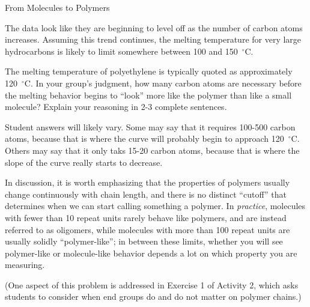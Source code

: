 \begin{activity}{From Molecules to Polymers}
\begin{ctqs}
		\begin{solution}[2in]
		
			The data look like they are beginning to level off as the number of carbon atoms increases.  Assuming this trend continues, the melting temperature for very large hydrocarbons is likely to limit somewhere between 100 and 150~${}^\circ$C. 
		\end{solution}
	
	\question The melting temperature of polyethylene is typically quoted as approximately 120~${}^\circ$C.  In your group's judgment, how many carbon atoms are necessary before the melting behavior begins to ``look'' more like the polymer than like a small molecule?  Explain your reasoning in 2-3 complete sentences. \label{\labelbase:ctq:npolymer}
	
		\begin{solution}[2in]
		
			Student answers will likely vary.  Some may say that it requires 100-500 carbon atoms, because that is where the curve will probably begin to approach 120~${}^\circ$C.  Others may say that it only taks 15-20 carbon atoms, because that is where the slope of the curve really starts to decrease.
			
			In discussion, it is worth emphasizing that the properties of polymers usually change continuously with chain length, and there is no distinct ``cutoff'' that determines when we can start calling something a polymer.  In \emph{practice}, molecules with fewer than 10 repeat units rarely behave like polymers, and are instead referred to as oligomers, while molecules with more than 100 repeat units are usually solidly ``polymer-like''; in between these limits, whether you will see polymer-like or molecule-like behavior depends a lot on which property you are measuring.
			
			(One aspect of this problem is addressed in Exercise 1 of Activity 2, which asks students to consider when end groups do and do not matter on polymer chains.)
		\end{solution}
	
	
			
\end{ctqs}

		

\begin{exercises}


\end{exercises}
\end{activity}
